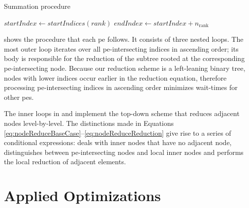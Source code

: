 \begin{algorithm}
\caption{Summation procedure}\label{algo:SummationAlgo}
\DontPrintSemicolon
\SetAlgoLined
$startIndex \gets startIndices (rank)$\;
$endIndex \gets startIndex + n_{\textrm{rank}}$\;
\For{$i \gets \rankIntersectingIndices ([\textrm{startIndex}, \textrm{endIndex})) $}{
	\For{$y \gets [1, \max_y(x)]$}{\label{algo:SummationAlgoTopDownFor}
		$x \gets startIndex$\;
		\While{$x < endIndex$}{\label{algo:SummationAlgoInnerLoop}
			$a \gets (x, y - 1)$\;
			$indexB \gets x + 2^{y - 1}$\;
			\uIf{$indexB \geq N$} {
				$(x,y) \gets a$\;\label{algo:SummationAlgoPassthrough}
			}
			\uElseIf{$\textrm{rankFromIndex}(indexB) \neq rank$}{
				$b \gets \textrm{receive}\ (indexB, \max_y(indexB))$\;\label{algo:SummationAlgoRankIntersectingNode}
				$(x,y) \gets a + b$\;
			}
			\Else{
				$b \gets (indexB, y-1)$\; \label{algo:SummationAlgoInnerNode}
				$(x,y) \gets a + b$\;
			}
			$x \gets x + 2^{y - 1}$\;
		}
	}
	$\textrm{send } (i, \max_y(i))$\;
}
\end{algorithm}

 shows the procedure that each \gls{pe} follows.
It consists of three nested loops.
The most outer loop iterates over all \gls{pe}-intersecting indices in ascending order; its body is responsible for the reduction of the subtree rooted at the corresponding \gls{pe}-intersecting node.
Because our reduction scheme is a left-leaning binary tree, nodes with lower indices occur earlier in the reduction equation, therefore processing \gls{pe}-intersecting indices in ascending order minimizes wait-times for other \glspl{pe}.


The inner loops in  and  implement the top-down scheme that reduces adjacent nodes level-by-level.
The distinctions made in Equations \eqref{eq:nodeReduceBaseCase}--\eqref{eq:nodeReduceReduction} give rise to a series of conditional expressions:  deals with inner nodes that have no adjacent node,  distinguishes between \gls{pe}-intersecting nodes and local inner nodes and  performs the local reduction of adjacent elements.

\section{Applied Optimizations}
\label{sec:AppliedOptimizations}

